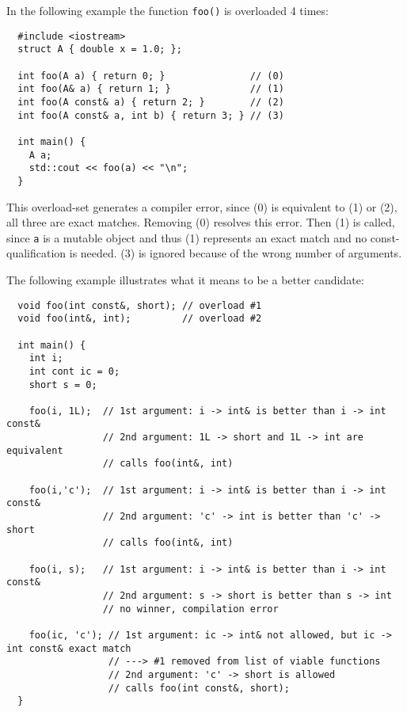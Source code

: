 \begin{example}
  In the following example the function \texttt{foo()} is overloaded 4 times:
  \begin{verbatim}
  #include <iostream>
  struct A { double x = 1.0; };

  int foo(A a) { return 0; }               // (0)
  int foo(A& a) { return 1; }              // (1)
  int foo(A const& a) { return 2; }        // (2)
  int foo(A const& a, int b) { return 3; } // (3)

  int main() {
    A a;
    std::cout << foo(a) << "\n";
  }
  \end{verbatim}
  This overload-set generates a compiler error, since (0) is equivalent to (1) or (2), \ie all three are exact matches. Removing (0) resolves this error.
  Then (1) is called, since \texttt{a} is a mutable object and thus (1) represents an exact match and no const-qualification is needed.
  (3) is ignored because of the wrong number of arguments.
\end{example}

\begin{example}
  The following example illustrates what it means to be a better candidate:
  \begin{verbatim}
  void foo(int const&, short); // overload #1
  void foo(int&, int);         // overload #2

  int main() {
    int i;
    int cont ic = 0;
    short s = 0;

    foo(i, 1L);  // 1st argument: i -> int& is better than i -> int const&
                 // 2nd argument: 1L -> short and 1L -> int are equivalent
                 // calls foo(int&, int)

    foo(i,'c');  // 1st argument: i -> int& is better than i -> int const&
                 // 2nd argument: 'c' -> int is better than 'c' -> short
                 // calls foo(int&, int)

    foo(i, s);   // 1st argument: i -> int& is better than i -> int const&
                 // 2nd argument: s -> short is better than s -> int
                 // no winner, compilation error

    foo(ic, 'c'); // 1st argument: ic -> int& not allowed, but ic -> int const& exact match
                  // ---> #1 removed from list of viable functions
                  // 2nd argument: 'c' -> short is allowed
                  // calls foo(int const&, short);
  }
  \end{verbatim}
\end{example}

